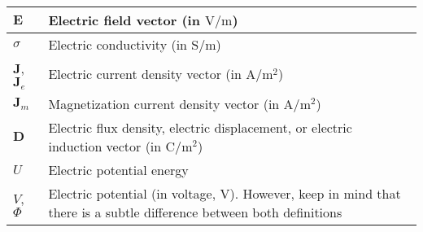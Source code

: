 \begin{xltabular}{\textwidth}{XX}
	\(\mathbf{E}\)                                                                                                                           & Electric field vector (in \(\si{\volt\per\meter}\))                                                                                                                                      \\ \hline
	\(\sigma\)                                                                                                                               & Electric conductivity (in \(\si{\siemens\per\meter}\))                                                                                                                                   \\ \hline
	\(\mathbf{J}\), \(\mathbf{J}_e\)\cite{rino2011theory}                                                                                    & Electric current density vector (in \(\si{\ampere\per\square\meter}\))                                                                                                                   \\ \hline
	\(\mathbf{J}_m\)\cite{chengFieldWaveElectromagnetics1989}                                                                                & Magnetization current density vector (in \(\si{\ampere\per\meter\squared}\))                                                                                                             \\ \hline
	\(\mathbf{D}\)                                                                                                                           & Electric flux density, electric displacement, or electric induction vector (in \(\si{\coulomb\per\meter\squared}\))                                                                      \\ \hline
	\(U\)                                                                                                                                    & Electric potential energy                                                                                                                                                                \\ \hline
	\(V\)\cite{wiki:electric-potential,chengFieldWaveElectromagnetics1989}, \(\Phi\)\cite{ramoFieldsWavesCommunication1994}                  & Electric potential (in voltage, \(\si{\volt}\)). However, keep in mind that there is a subtle difference between both definitions \cite{stackexchange:electric-potential-vs-voltage}     \\ \hline

\end{xltabular}
